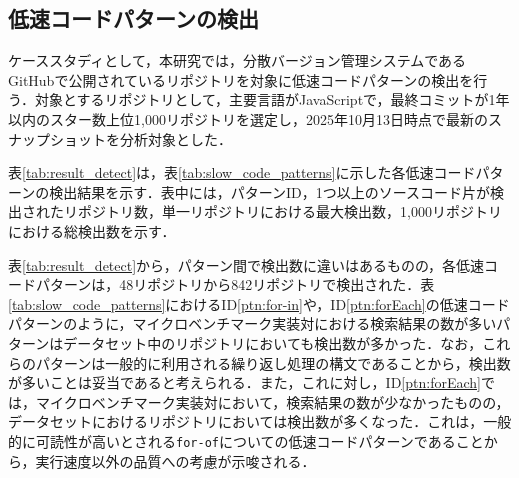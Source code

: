 \documentclass[submit,techrep,noauthor]{ipsj}
\begin{document}
\subsection{低速コードパターンの検出}

ケーススタディとして，本研究では，分散バージョン管理システムであるGitHubで公開されているリポジトリを対象に低速コードパターンの検出を行う．対象とするリポジトリとして，主要言語がJavaScriptで，最終コミットが1年以内のスター数上位1,000リポジトリを選定し，2025年10月13日時点で最新のスナップショットを分析対象とした．

表\ref{tab:result_detect}は，表\ref{tab:slow_code_patterns}に示した各低速コードパターンの検出結果を示す．表中には，パターンID，1つ以上のソースコード片が検出されたリポジトリ数，単一リポジトリにおける最大検出数，1,000リポジトリにおける総検出数を示す．

表\ref{tab:result_detect}から，パターン間で検出数に違いはあるものの，各低速コードパターンは，48リポジトリから842リポジトリで検出された．表\ref{tab:slow_code_patterns}におけるID\ref{ptn:for-in}や，ID\ref{ptn:forEach}の低速コードパターンのように，マイクロベンチマーク実装対における検索結果の数が多いパターンはデータセット中のリポジトリにおいても検出数が多かった．なお，これらのパターンは一般的に利用される繰り返し処理の構文であることから，検出数が多いことは妥当であると考えられる．また，これに対し，ID\ref{ptn:forEach}では，マイクロベンチマーク実装対において，検索結果の数が少なかったものの，データセットにおけるリポジトリにおいては検出数が多くなった．これは，一般的に可読性が高いとされる\texttt{for-of}についての低速コードパターンであることから，実行速度以外の品質への考慮が示唆される．

\begin{table}[t]
    \centering
    \caption{低速コードパターンに基づく検出結果}
    \label{tab:result_detect}
\end{table}
\end{document}
